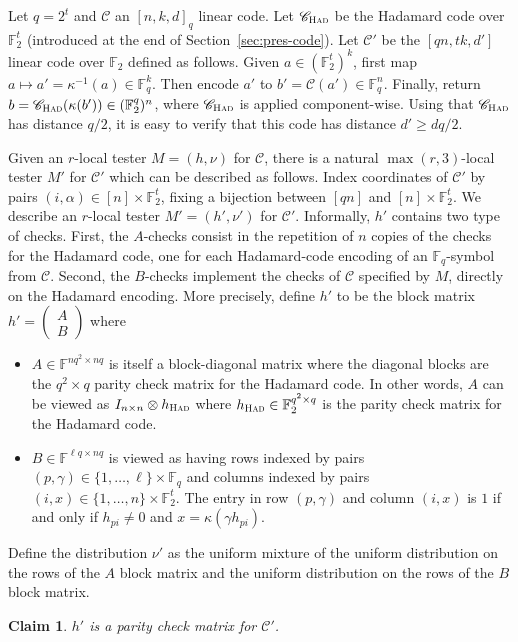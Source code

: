 \documentclass[11pt]{article}
\newtheorem{claim}[theorem]{Claim}
\theoremstyle{definition}
\newcommand{\code}{\mathscr{C}}
\newcommand{\F}{\ensuremath{\mathbb{F}}}
\newcommand{\Had}{\ensuremath{\textsc{Had}}}
\newcommand{\had}{\textsc{Had}}
\begin{document}
Let $q=2^t$ and $\code$ an $[n,k,d]_q$ linear code. Let $\code_{\Had}$ be the Hadamard code over $\F_2^t$ (introduced at the end of Section~\ref{sec:pres-code}). 
Let $\code'$ be the $[qn,tk,d']$ linear code over $\F_2$ defined as follows. Given $a\in (\F_2^t)^{k}$, first map $a\mapsto a'=\kappa^{-1}(a) \in \F_q^{k}$. Then encode $a'$ to $b'=\code(a')\in \F_q^n$. Finally, return $b=\code_\Had(\kappa(b'))\in(\F_2^q)^n$, where $\code_\Had$ is applied component-wise. Using that $\code_\Had$ has distance $q/2$, it is easy to verify that this code has distance $d'\geq dq/2$.

Given an $r$-local tester $M=(h,\nu)$ for $\code$, there is a natural $\max(r,3)$-local tester $M'$ for $\code'$ which can be described as follows. Index coordinates of $\code'$ by pairs $(i,\alpha)\in [n]\times\F_2^t$, fixing a bijection between $[qn]$ and $[n]\times \F_2^t$.  We describe an $r$-local  tester $M' = (h',\nu')$ for $\code'$. Informally, $h'$ contains two type of checks. First, the $A$-checks consist in the repetition of $n$ copies of the checks for the Hadamard code, one for each Hadamard-code encoding of an $\F_q$-symbol from $\code$. Second, the $B$-checks implement the checks of $\code$ specified by $M$, directly on the Hadamard encoding. More precisely, define $h'$ to be the block matrix $h'=\begin{pmatrix} A \\ B \end{pmatrix}$ where 
\begin{itemize}
	\item $A \in \F^{nq^2 \times nq}$ is itself a block-diagonal matrix where the diagonal blocks are the $q^2 \times q$ parity check matrix for the Hadamard code. 
	In other words, $A$ can be viewed as $I_{n\times n} \otimes h_\had$ where $h_\had \in \F_2^{q^2 \times q}$ is the parity check matrix for the Hadamard code. 
	\item $B \in \F^{\ell q \times nq}$ is viewed as having rows indexed by pairs $(p,\gamma) \in \{1,\ldots,\ell\} \times \F_q$ and columns indexed by pairs $(i,x) \in \{1,\ldots,n\} \times \F_2^t$. The entry in row $(p,\gamma)$ and column $(i,x)$ is $1$ if and only if $h_{pi} \neq 0$ and $x = \kappa(\gamma h_{pi})$.
\end{itemize}
Define the distribution $\nu'$ as the uniform mixture of the uniform distribution on the rows of the $A$ block matrix and the uniform distribution on the rows of the $B$ block matrix. 

\begin{claim}
$h'$ is a parity check matrix for $\code'$.
\end{claim}
\end{document}
